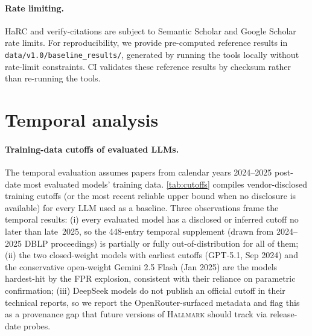 \paragraph{Rate limiting.}
HaRC and verify-citations are subject to Semantic Scholar and Google Scholar rate limits.
For reproducibility, we provide pre-computed reference results in \texttt{data/v1.0/baseline\_results/}, generated by running the tools locally without rate-limit constraints.
CI validates these reference results by checksum rather than re-running the tools.

\section{Temporal analysis}
\label{app:temporal}

\paragraph{Training-data cutoffs of evaluated LLMs.}
\label{app:cutoffs}
The temporal evaluation assumes papers from calendar years 2024--2025 post-date most evaluated models' training data. \cref{tab:cutoffs} compiles vendor-disclosed training cutoffs (or the most recent reliable upper bound when no disclosure is available) for every LLM used as a baseline. Three observations frame the temporal results: (i) every evaluated model has a disclosed or inferred cutoff no later than late~2025, so the 448-entry temporal supplement (drawn from 2024--2025 DBLP proceedings) is partially or fully out-of-distribution for all of them; (ii) the two closed-weight models with earliest cutoffs (GPT-5.1, Sep 2024) and the conservative open-weight Gemini 2.5 Flash (Jan 2025) are the models hardest-hit by the FPR explosion, consistent with their reliance on parametric confirmation; (iii) DeepSeek models do not publish an official cutoff in their technical reports, so we report the OpenRouter-surfaced metadata and flag this as a provenance gap that future versions of \textsc{Hallmark} should track via release-date probes.

